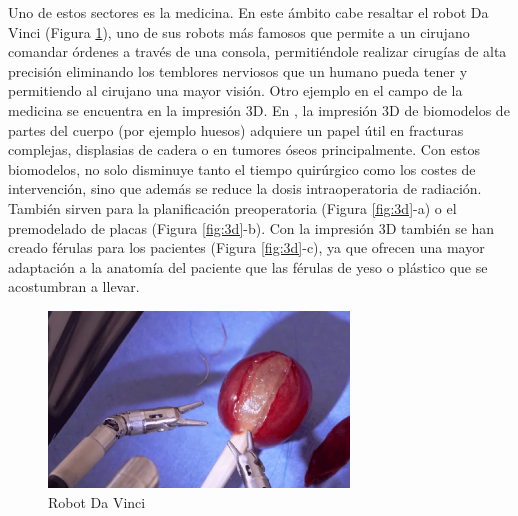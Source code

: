 Uno de estos sectores es la medicina. En este ámbito cabe resaltar el robot Da Vinci (Figura \ref{fig:da-vinci}), uno de sus robots más famosos que permite a un cirujano comandar órdenes a través de una consola, permitiéndole realizar cirugías de alta precisión eliminando los temblores nerviosos que un humano pueda tener y permitiendo al cirujano una mayor visión. Otro ejemplo en el campo de la medicina se encuentra en la impresión 3D. En \cite{ANDRESCANO2021138}, la impresión 3D de biomodelos de partes del cuerpo (por ejemplo huesos) adquiere un papel útil en fracturas complejas, displasias de cadera o en tumores óseos principalmente. Con estos biomodelos, no solo disminuye tanto el tiempo quirúrgico como los costes de intervención, sino que además se reduce la dosis intraoperatoria de radiación. También sirven para la planificación preoperatoria (Figura \ref{fig:3d}-a) o el premodelado de placas (Figura \ref{fig:3d}-b). Con la impresión 3D también se han creado férulas para los pacientes (Figura \ref{fig:3d}-c), ya que ofrecen una mayor adaptación a la anatomía del paciente que las férulas de yeso o plástico que se acostumbran a llevar.\\
\begin{figure} [h!]
  \begin{center}
    \includegraphics[width=8cm]{figs/da-vinci}
  \end{center}
  \caption{Robot Da Vinci}
  \label{fig:da-vinci}
\end{figure}

